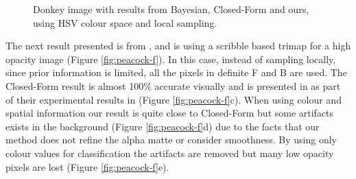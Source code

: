 \begin{figure}[t!]
\caption[Donkey benchmark image with various results.]{Donkey image with results from Bayesian, Closed-Form and ours, using HSV colour space and local sampling.}
\label{fig:donkey-f}
\end{figure}

The next result presented is from \cite{closedform}, and is using a scribble based trimap for a high opacity image (Figure \ref{fig:peacock-f}). In this case, instead of sampling locally, since prior information is limited, all the pixels in definite F and B are used. The Closed-Form result is almost 100\% accurate visually and is presented in as part of their experimental results in \cite{closedform} (Figure \ref{fig:peacock-f}c). When using colour and spatial information our result is quite close to Closed-Form but some artifacts exists in the background (Figure \ref{fig:peacock-f}d) due to the facts that our method does not refine the alpha matte or consider smoothness. By using only colour values for classification the artifacts are removed but many low opacity pixels are lost (Figure \ref{fig:peacock-f}e).

